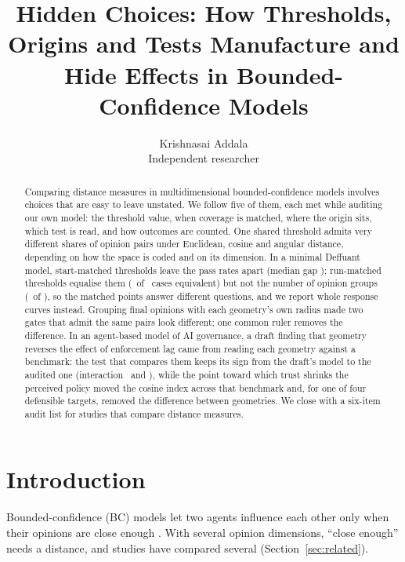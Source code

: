 \documentclass[11pt]{article}
\title{Hidden Choices: How Thresholds, Origins and Tests Manufacture and Hide Effects in Bounded-Confidence Models}
\author{Krishnasai Addala\\ \small Independent researcher}
\date{}
\begin{document}
\maketitle

\begin{abstract}
Comparing distance measures in multidimensional bounded-confidence models involves choices that are easy to leave unstated.
We follow five of them, each met while auditing our own model: the threshold value, when coverage is matched, where the origin sits, which test is read, and how outcomes are counted.
One shared threshold admits very different shares of opinion pairs under Euclidean, cosine and angular distance, depending on how the space is coded and on its dimension.
In a minimal Deffuant model, start-matched thresholds leave the pass rates apart (median gap \VTzeroPassGap); run-matched thresholds equalise them (\VRunPassEquiv\ of \VCases\ cases equivalent) but not the number of opinion groups (\VRunGroupEquiv\ of \VCases), so the matched points answer different questions, and we report whole response curves instead.
Grouping final opinions with each geometry's own radius made two gates that admit the same pairs look different; one common ruler removes the difference.
In an agent-based model of AI governance, a draft finding that geometry reverses the effect of enforcement lag came from reading each geometry against a benchmark: the test that compares them keeps its sign from the draft's model to the audited one (interaction \VCDraftInter\ and \VCRecommendedInter), while the point toward which trust shrinks the perceived policy moved the cosine index across that benchmark and, for one of four defensible targets, removed the difference between geometries.
We close with a six-item audit list for studies that compare distance measures.
\end{abstract}

\section{Introduction}

Bounded-confidence (BC) models let two agents influence each other only when their opinions are close enough \citep{deffuant2000,hegselmann2002}.
With several opinion dimensions, ``close enough'' needs a distance, and studies have compared several (Section~\ref{sec:related}).
\end{document}
